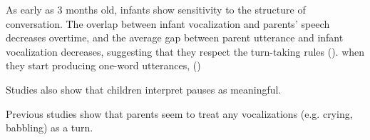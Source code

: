 As early as 3 months old, infants show sensitivity to the structure of conversation. The overlap between infant vocalization and parents' speech decreases overtime, and the average gap between parent utterance and infant vocalization decreases, suggesting that they respect the turn-taking rules (\cite{hilbrink2013turn3mo}).  when they start producing one-word utterances,  (\cite{hilbrink2013turn})


Studies also show that children interpret pauses as meaningful.

Previous studies show that parents seem to treat any vocalizations (e.g. crying, babbling) as a turn. 

